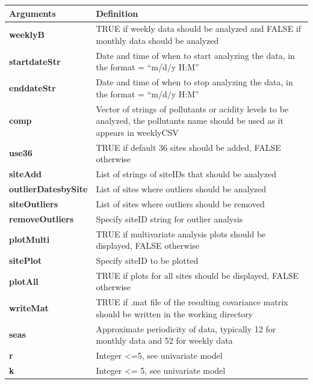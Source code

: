 \documentclass[11pt]{article}\usepackage[]{graphicx}\usepackage[]{color}
\newenvironment{knitrout}{}{} %
\begin{document}
\begin{knitrout}
\color{fgcolor}\begin{table}[H]
\centering\begin{table}[H]
\centering
\begin{tabular}{>{\bfseries\leavevmode\color{black}}l>{\raggedright\arraybackslash}p{30em}}
\toprule
Arguments & Definition\\
\midrule
\rowcolor{gray!6}  weeklyB & TRUE if weekly data should be analyzed and FALSE if monthly data should be analyzed\\
startdateStr & Date and time of when to start analyzing the data, in the format = “m/d/y H:M”\\
\rowcolor{gray!6}  enddateStr & Date and time of when to stop analyzing the data, in the format = “m/d/y H:M”\\
comp & Vector of strings of pollutants or acidity levels to be analyzed, the pollutants name should be used as it appears in weeklyCSV\\
\rowcolor{gray!6}  use36 & TRUE if default 36 sites should be added, FALSE otherwise\\
\addlinespace
siteAdd & List of strings of siteIDs that should be analyzed\\
\rowcolor{gray!6}  outlierDatesbySite & List of sites where outliers should be analyzed\\
siteOutliers & List of sites where outliers should be removed\\
\rowcolor{gray!6}  removeOutliers & Specify siteID string for outlier analysis\\
plotMulti & TRUE if multivariate analysis plots should be displayed, FALSE otherwise\\
\addlinespace
\rowcolor{gray!6}  sitePlot & Specify siteID to be plotted\\
plotAll & TRUE if plots for all sites should be displayed, FALSE otherwise\\
\rowcolor{gray!6}  writeMat & TRUE if  .mat file of the resulting covariance matrix should be written in the working directory\\
seas & Approximate periodicity of data, typically 12 for monthly data and 52 for weekly data\\
\rowcolor{gray!6}  r & Integer <=5, see univariate model\\
k & Integer <= 5, see univariate model\\
\bottomrule
\end{tabular}
\end{table}
\end{table}


\end{knitrout}
\end{document}
